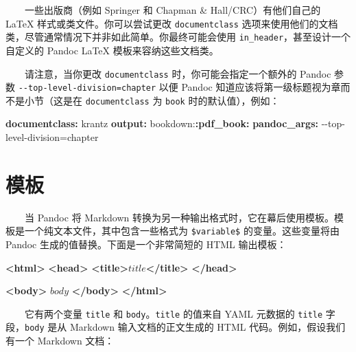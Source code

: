\documentclass[
  12pt,
]{krantz}
\newenvironment{Shaded}{\begin{snugshade}}{\end{snugshade}}
\newcommand{\AttributeTok}[1]{\textcolor[rgb]{0.13,0.29,0.53}{#1}}
\newcommand{\FunctionTok}[1]{\textcolor[rgb]{0.13,0.29,0.53}{\textbf{#1}}}
\newcommand{\KeywordTok}[1]{\textcolor[rgb]{0.13,0.29,0.53}{\textbf{#1}}}
\newcommand{\NormalTok}[1]{#1}
\theoremstyle{definition}
\theoremstyle{definition}
\theoremstyle{definition}
\theoremstyle{definition}
\theoremstyle{remark}
\begin{document}
  一些出版商（例如 Springer 和 Chapman \& Hall/CRC）有他们自己的 LaTeX 样式或类文件。你可以尝试更改 \texttt{documentclass} 选项来使用他们的文档类，尽管通常情况下并非如此简单。你最终可能会使用 \texttt{in\_header}，甚至设计一个自定义的 Pandoc LaTeX 模板来容纳这些文档类。

  请注意，当你更改 \texttt{documentclass} 时，你可能会指定一个额外的 Pandoc 参数 \texttt{-\/-top-level-division=chapter} 以便 Pandoc 知道应该将第一级标题视为章而不是小节（这是在 \texttt{documentclass} 为 \texttt{book} 时的默认值），例如：

\begin{Shaded}
\begin{Highlighting}[]
\FunctionTok{documentclass}\KeywordTok{:}\AttributeTok{ krantz}
\FunctionTok{output}\KeywordTok{:}
\AttributeTok{  bookdown:}\FunctionTok{:pdf\_book}\KeywordTok{:}
\AttributeTok{    }\FunctionTok{pandoc\_args}\KeywordTok{:}\AttributeTok{ {-}{-}top{-}level{-}division=chapter}
\end{Highlighting}
\end{Shaded}

\hypertarget{ux6a21ux677f}{%
\section{模板}\label{ux6a21ux677f}}

  当 Pandoc 将 Markdown 转换为另一种输出格式时，它在幕后使用模板。模板是一个纯文本文件，其中包含一些格式为 \texttt{\$variable\$} 的变量。这些变量将由 Pandoc 生成的值替换。下面是一个非常简短的 HTML 输出模板：

\begin{Shaded}
\begin{Highlighting}[]
\KeywordTok{\textless{}html\textgreater{}}
  \KeywordTok{\textless{}head\textgreater{}}
    \KeywordTok{\textless{}title\textgreater{}}\NormalTok{$title$}\KeywordTok{\textless{}/title\textgreater{}}
  \KeywordTok{\textless{}/head\textgreater{}}
  
  \KeywordTok{\textless{}body\textgreater{}}
\NormalTok{  $body$}
  \KeywordTok{\textless{}/body\textgreater{}}
\KeywordTok{\textless{}/html\textgreater{}}
\end{Highlighting}
\end{Shaded}

  它有两个变量 \texttt{title} 和 \texttt{body}。\texttt{title} 的值来自 YAML 元数据的 \texttt{title} 字段，\texttt{body} 是从 Markdown 输入文档的正文生成的 HTML 代码。例如，假设我们有一个 Markdown 文档：
\end{document}
